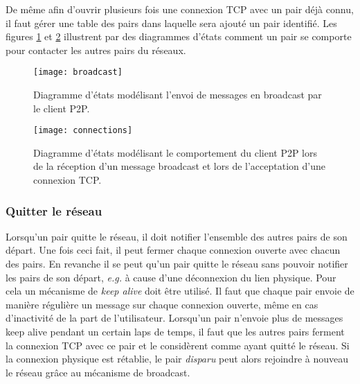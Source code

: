 De même afin d'ouvrir plusieurs fois une connexion TCP avec un pair déjà
connu, il faut gérer une table des pairs dans laquelle sera ajouté un
pair identifié. Les figures \ref{fig:broadcast} et \ref{fig:connections}
illustrent par des diagrammes d'états comment un pair se comporte pour
contacter les autres pairs du réseaux.

\begin{figure}[!h]
  \centering
  \texttt{[image: broadcast]}
  \caption{Diagramme d'états modélisant l'envoi de messages en broadcast
    par le client P2P.}
  \label{fig:broadcast}
\end{figure}

\begin{figure}[!h]
  \centering
  \texttt{[image: connections]}
  \caption{Diagramme d'états modélisant le comportement du client P2P lors
    de la réception d'un message broadcast et lors de l'acceptation d'une
    connexion TCP.}
  \label{fig:connections}
\end{figure}

\subsubsection{Quitter le réseau}
Lorsqu'un pair quitte le réseau, il doit notifier l'ensemble des autres
pairs de son départ. Une fois ceci fait, il peut fermer chaque connexion
ouverte avec chacun des pairs. En revanche il se peut qu'un pair quitte
le réseau sans pouvoir notifier les pairs de son départ, \emph{e.g.}
à cause d'une déconnexion du lien physique. Pour cela un mécanisme
de \emph{keep alive} doit être utilisé. Il faut que chaque pair envoie
de manière régulière un message sur chaque connexion ouverte, même en cas
d'inactivité de la part de l'utilisateur. Lorsqu'un pair n'envoie plus
de messages keep alive pendant un certain laps de temps, il faut que les
autres pairs ferment la connexion TCP avec ce pair et le considèrent comme
ayant quitté le réseau. Si la connexion physique est rétablie, le pair
\emph{disparu} peut alors rejoindre à nouveau le réseau grâce au mécanisme
de broadcast.

